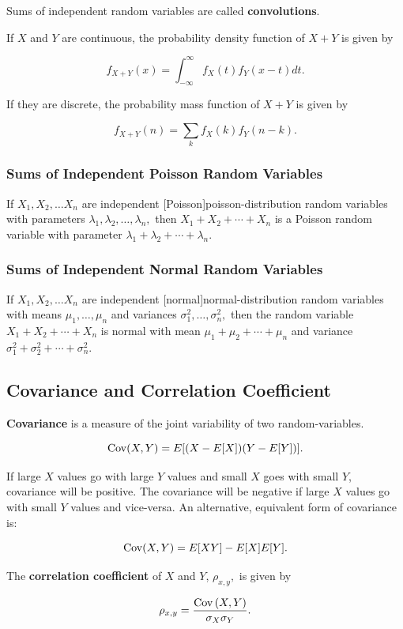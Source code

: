 \documentclass{article}
\begin{document}
\begin{definition}[Convolution]
Sums of \@{independent} \@{random variables} are called \textbf{convolutions}.

If $X$ and $Y$ are continuous, the \@{probability density function} of $X + Y$ is given by

\[ f_{X+Y}(x) = \int_{-\infty}^{\infty} f_X(t) f_Y(x - t) dt. \]

If they are discrete, the \@{probability mass function} of $X + Y$ is given by

\[ f_{X+Y}(n) = \sum_k f_X(k)f_Y(n - k). \]
\end{definition}

\subsubsection{Sums of Independent Poisson Random Variables}

\begin{theorem}\label{sum-independent-poisson}
If $X_1, X_2, \dots X_n$ are \@{independent} \@[Poisson]{poisson-distribution} \@{random variables} with parameters $\lambda_1, \lambda_2, \dots, \lambda_n,$ then $X_1 + X_2 + \cdots + X_n$ is a Poisson random variable with parameter $\lambda_1 + \lambda_2 + \cdots  + \lambda_n.$
\end{theorem}

\subsubsection{Sums of Independent Normal Random Variables}

\begin{theorem}\label{sum-independent-normal}
If $X_1, X_2, \dots X_n$ are \@{independent} \@[normal]{normal-distribution} \@{random variables} with means $\mu_1, \dots, \mu_n$ and \@{variances} $\sigma_1^2, \dots, \sigma_n^2,$ then the random variable $X_1 + X_2 + \cdots + X_n$ is normal with mean $\mu_1 + \mu_2 + \cdots + \mu_n$ and variance $\sigma_1^2 + \sigma_2^2 + \cdots + \sigma_n^2.$
\end{theorem}

\subsection{Covariance and Correlation Coefficient}
\begin{definition}[Covariance]
\textbf{Covariance} is a measure of the joint variability of two \@{random-variables}.

\[ \operatorname{Cov}(X,Y) = E[(X - E[X])(Y - E[Y])]. \]

If large $X$ values go with large $Y$ values and small $X$ goes with small $Y$, covariance will be positive. The covariance will be negative if large $X$ values go with small $Y$ values and vice-versa. An alternative, equivalent form of covariance is:

\[ \operatorname{Cov}(X,Y) = E[XY] - E[X]E[Y]. \]
\end{definition}

\begin{definition}
The \textbf{correlation coefficient} of $X$ and $Y$, $\rho_{x,y},$ is given by

\[ \rho_{x,y} = \frac{\operatorname{Cov}{(X, Y)}}{\sigma_X \sigma_Y}. \]
\end{definition}
\end{document}
